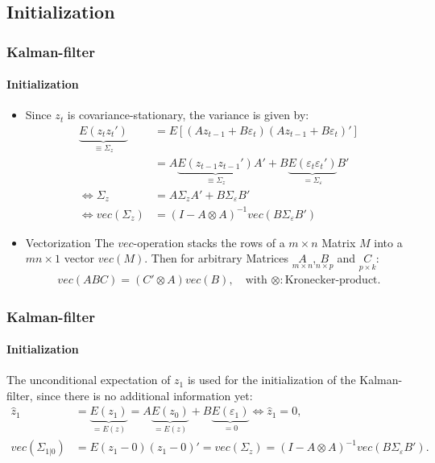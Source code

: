 \documentclass[handout]{beamer}  %
\begin{document}
\subsection{Initialization}
\begin{frame}\frametitle{Kalman-filter}\framesubtitle{Initialization}
	\begin{itemize}
		\item Since ${z_t}$ is covariance-stationary, the variance is given by:
		\begin{align*}
			\underbrace{E({z_t} {z_t}')}_{\equiv {\Sigma_z}}&=E\left[({A} {z_{t-1}} + {B} {\varepsilon_t})({A} {z_{t-1}} + {B} {\varepsilon_t})'\right] \\
			&= {A} \underbrace{E({z_{t-1}}{z_{t-1}}')}_{\equiv {\Sigma_z}}{A}' + {B} \underbrace{E({\varepsilon_t} {\varepsilon_t}')}_{={\Sigma_\varepsilon}} {B}'\\
			\Leftrightarrow {\Sigma_z} &= {A} {\Sigma_z} {A'} + {B} {\Sigma_\varepsilon} {B}'\\
			\Leftrightarrow    vec({\Sigma_z}) &= ({I}-{A} \otimes {A})^{-1} vec({B} {\Sigma_\varepsilon} {B}')
		\end{align*}
		\item \begin{block}{Vectorization}
			The $vec$-operation stacks the rows of a $m\times n$ Matrix ${M}$ into a $mn\times 1$ vector $vec({M})$. Then for arbitrary Matrices $\underset{m\times n}{A}$,$\underset{n\times p}{B}$ and $\underset{p \times k}{C}$:
			\begin{align*}
				vec(ABC) = (C' \otimes A)vec(B), \quad \text{with } \otimes: \text{Kronecker-product.}
			\end{align*}
		\end{block}
	\end{itemize}
\end{frame}

\begin{frame}\frametitle{Kalman-filter}\framesubtitle{Initialization}
	The unconditional expectation of ${z_1}$ is used for the initialization of the Kalman-filter, since there is no additional information yet:
	\begin{align*}
		{\widehat{z}_1} &= \underbrace{E({z_1})}_{=E({z})} = {A }\underbrace{E({z_0})}_{=E({z})} + {B}\underbrace{E({\varepsilon_1})}_{=0} \Leftrightarrow {\widehat{z}_1} = {0},\\
		vec({\Sigma_{1|0}}) & = E({z_1}-{0})({z_1}-{0})'= vec({\Sigma_z}) = ({I}-{A} \otimes {A})^{-1} vec({B} {\Sigma_\varepsilon} {B}').
	\end{align*}
	
\end{frame}
\end{document}
